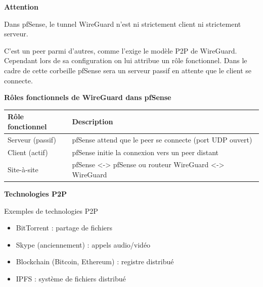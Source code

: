 \vspace{0.5cm}

\noindent \textbf{Attention}

\noindent Dans pfSense, le tunnel WireGuard n'est ni strictement client ni strictement serveur.

\noindent C’est un peer parmi d'autres, comme l’exige le modèle P2P de WireGuard. Cependant lors de sa configuration on lui attribue un rôle fonctionnel. Dans le cadre de cette corbeille pfSense sera un serveur passif en attente que le client se connecte.

\noindent \textbf{Rôles fonctionnels de WireGuard dans pfSense}

\vspace{0.5cm}

\begin{center}
\setlength{\tabcolsep}{12pt}
\begin{tabular}{|p{}|p{}|}
\hline
\textbf{Rôle fonctionnel} & \textbf{Description} \\ \hline

Serveur (passif) & pfSense attend que le peer se connecte (port UDP ouvert) \\ \hline

Client (actif) & pfSense initie la connexion vers un peer distant \\ \hline

Site-à-site & pfSense <-> pfSense ou routeur WireGuard <-> WireGuard \\ \hline

\end{tabular}
\end{center}

\vspace{0.5cm}

\noindent \textbf{Technologies P2P}

\noindent Exemples de technologies P2P

\begin{itemize}
  \item BitTorrent : partage de fichiers
  \item Skype (anciennement) : appels audio/vidéo
  \item Blockchain (Bitcoin, Ethereum) : registre distribué
  \item IPFS : système de fichiers distribué
\end{itemize}

\vspace{0.5cm}

